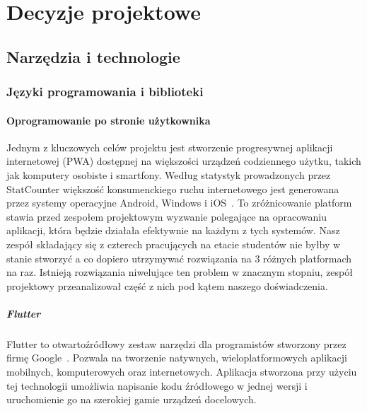 
\chapter{Decyzje projektowe}
\label{ch:decyzje-projektowe}

\section{Narzędzia i technologie}
\label{sec:narzedzia-i-technologie}

\subsection{Języki programowania i biblioteki}
\label{subsec:jezyki-programowania-i-biblioteki}

\subsubsection{Oprogramowanie po stronie użytkownika}
Jednym z kluczowych celów projektu jest stworzenie progresywnej aplikacji internetowej (PWA) dostępnej na większości urządzeń codziennego użytku, takich jak komputery osobiste i smartfony.
Według statystyk prowadzonych przez StatCounter większość konsumenckiego ruchu internetowego jest generowana przez systemy operacyjne Android, Windows i iOS~\cite{statcounter-os-shares}\@.
To zróżnicowanie platform stawia przed zespołem projektowym wyzwanie polegające na opracowaniu aplikacji, która będzie działała efektywnie na każdym z tych systemów.
Nasz zespół składający się z czterech pracujących na etacie studentów nie byłby w stanie stworzyć a co dopiero utrzymywać rozwiązania na 3 różnych platformach na raz.
Istnieją rozwiązania niwelujące ten problem w znacznym stopniu, zespół projektowy przeanalizował część z nich pod kątem naszego doświadczenia.

\paragraph{Flutter}
Flutter to otwartoźródłowy zestaw narzędzi dla programistów stworzony przez firmę Google~\cite{flutter-quick-start}.
Pozwala na tworzenie natywnych, wieloplatformowych aplikacji mobilnych, komputerowych oraz internetowych.
Aplikacja stworzona przy użyciu tej technologii umożliwia napisanie kodu źródłowego w jednej wersji i uruchomienie go na szerokiej gamie urządzeń docelowych.

